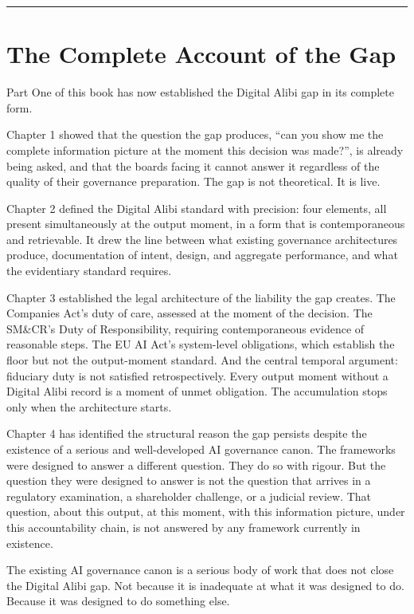 \begin{center}\rule{0.5\linewidth}{0.5pt}\end{center}

\section{The Complete Account of the Gap}

Part One of this book has now established the Digital Alibi gap in its complete form.

Chapter 1 showed that the question the gap produces, ``can you show me the complete information picture at the moment this decision was made?'', is already being asked, and that the boards facing it cannot answer it regardless of the quality of their governance preparation. The gap is not theoretical. It is live.

Chapter 2 defined the Digital Alibi standard with precision: four elements, all present simultaneously at the output moment, in a form that is contemporaneous and retrievable. It drew the line between what existing governance architectures produce, documentation of intent, design, and aggregate performance, and what the evidentiary standard requires.

Chapter 3 established the legal architecture of the liability the gap creates. The Companies Act's duty of care, assessed at the moment of the decision. The SM\&CR's Duty of Responsibility, requiring contemporaneous evidence of reasonable steps. The EU AI Act's system-level obligations, which establish the floor but not the output-moment standard. And the central temporal argument: fiduciary duty is not satisfied retrospectively. Every output moment without a Digital Alibi record is a moment of unmet obligation. The accumulation stops only when the architecture starts.

Chapter 4 has identified the structural reason the gap persists despite the existence of a serious and well-developed AI governance canon. The frameworks were designed to answer a different question. They do so with rigour. But the question they were designed to answer is not the question that arrives in a regulatory examination, a shareholder challenge, or a judicial review. That question, about this output, at this moment, with this information picture, under this accountability chain, is not answered by any framework currently in existence.

The existing AI governance canon is a serious body of work that does not close the Digital Alibi gap. Not because it is inadequate at what it was designed to do. Because it was designed to do something else.

